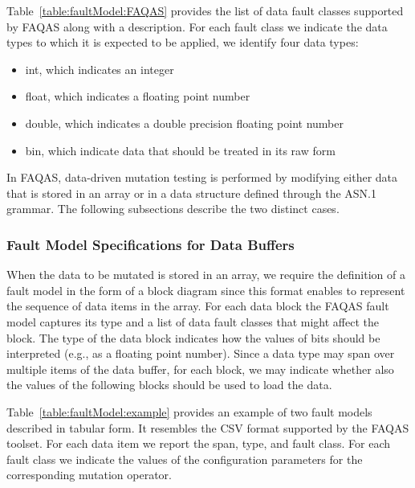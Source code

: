 Table~\ref{table:faultModel:FAQAS} provides the list of data fault classes supported by FAQAS along with a description. For each fault class we indicate the data types to which it is expected to be applied, we identify four data types: 
\begin{itemize}
\item int, which indicates an integer
\item float, which indicates a floating point number
\item double, which indicates a double precision floating point number
\item bin, which indicate data that should be treated in its raw form
\end{itemize}


In FAQAS, data-driven mutation testing is performed by modifying either data that is stored in an array or in a data structure defined through the ASN.1 grammar. The following subsections describe the two distinct cases.









\subsubsection{Fault Model Specifications for Data Buffers}

When the data to be mutated is stored in an array, we require the definition of a fault model in the form of a block diagram since this format enables to represent the sequence of data items in the array. 
For each data block the FAQAS fault model captures its type and a list of data fault classes that might affect the block. 
The type of the data block indicates how the values of bits should be interpreted (e.g., as a floating point number). Since a data type may span over multiple items of the data buffer, for each block, we may indicate whether also the values of the following blocks should be used to load the data.

Table~\ref{table:faultModel:example} provides an example of two fault models described in tabular form. 
It resembles the CSV format supported by the FAQAS toolset. For each data item we report the span, type, and fault class. For each fault class we indicate the values of the configuration parameters for the corresponding mutation operator.




